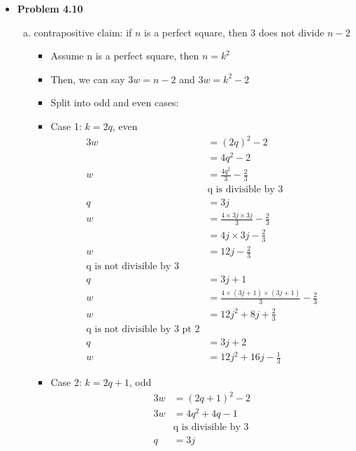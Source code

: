 \documentclass{article}
\begin{document}
\begin{itemize}
        \item \textbf{Problem 4.10}
        \begin{enumerate}[(k)]
            \item contrapositive claim: if $n$ is a perfect square, then 3 does not divide $n-2$
            \begin{itemize}
                \item Assume n is a perfect square, then $n = k^2$
                \item Then, we can say $3w = n-2$ and $3w = k^2 -2$
                \item Split into odd and even cases:
                \item Case 1: $k = 2q$, even
                \begin{align*}
                    3w &= (2q)^2 - 2\\
                    &= 4q^2-2\\
                    w&=\frac{4q^2}{3} - \frac{2}{3}\\
                    &\text{q is divisible by 3}\\
                    q &= 3j\\
                    w &= \frac{4 \times 3j \times 3j}{3} - \frac{2}{3}\\
                    &= 4j \times 3j - \frac{2}{3}\\
                    w &= 12j - \frac{2}{3}\\
                    \text{q is not divisible by 3}\\
                    q &= 3j + 1\\
                    w &= \frac{4 \times (3j+1) \times (3j+1)}{3} - \frac{2}{3}\\
                    w &= 12j^2 + 8j + \frac{2}{3}\\
                    \text{q is not divisible by 3 pt 2}\\
                    q &= 3j + 2\\
                    w &= 12j^2 + 16j - \frac{1}{3}
                \end{align*}
                \item Case 2: $k = 2q + 1$, odd
                \begin{align*}
                    3w &= (2q+1)^2 - 2\\
                    3w &= 4q^2 + 4q - 1\\
                    &\text{q is divisible by 3}\\
                    q &= 3j\\

\end{align*}
\end{itemize}
\end{enumerate}
\end{itemize}
\end{document}
